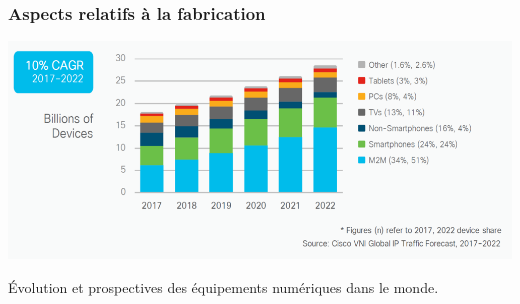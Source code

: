 \subsubsection[Aspects de fabrication]{Aspects relatifs à la fabrication}
\label{subsub:IX.4.2.1}


\begin{jazzfigure}
\includegraphics[width=\linewidth]{./Images/Chapter09/figIX-03-billions-of-devices.png}
\caption{\label{fig:IX.3}Évolution et prospectives des équipements numériques dans le monde.}
\end{jazzfigure}



